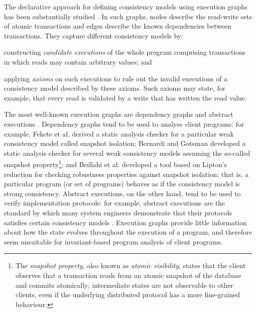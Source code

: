 The declarative approach for defining 
consistency models using execution graphs has been substantially
studied \cite{adya,ev_transactions,framework-concur,SIanalysis,laws}. 
In such graphs,  nodes  describe the read-write sets of  atomic transactions and edges describe the
known dependencies between transactions.
They capture different consistency models by:
\begin{enumerate*}
\item constructing  \emph{candidate executions} of the whole program comprising
transactions in which reads may contain arbitrary values; and 
\item applying  \emph{axioms}  on such executions to
  rule out the invalid executions of 
a consistency model described  by
  these axioms. 
Such axioms may state, for example, that every read is
validated by a write that has written the read value. 
\end{enumerate*}
The most well-known execution graphs are dependency graphs \cite{adya} and abstract
executions \cite{ev_transactions,framework-concur}. 
Dependency graphs tend to be used to analyse  client programs: for
example, 
Fekete et al. \citet{fekete-tods} derived 
a static analysis checker for a particular weak consistency model called
snapshot isolation;  Bernardi and Gotsman \citet{giovanni_concur16}
developed a static analysis checker for several weak consistency
models assuming the so-called snapshot property\footnote{The \emph{snapshot property}, 
also known as \emph{atomic visibility}, states that
the client observes that a transaction reads from an atomic snapshot
of the database and commits atomically;  intermediate states are not observable to other clients, 
even if the underlying distributed protocol has a more fine-grained behaviour.}; and 
Beillahi et al. \citep{snapshot-isolation-robust-tool} developed a tool based on Lipton's reduction \cite{Lipton-reduction}
for checking robustness properties against snapshot isolation: 
that is, a  particular program (or set of programs) behaves as if the consistency model is strong consistency. 
Abstract executions, on the other hand, tend to be used to verify  implementation protocols: for example,
abstract executions are the  standard by which many system engineers
demonstrate that their protocols satisfies  certain
consistency models \cite{cops,NMSI,PSI}. 
Execution graphs provide little information about how the 
state evolves throughout the execution of a program, and 
therefore seem  unsuitable for invariant-based program analysis 
of client programs. 


